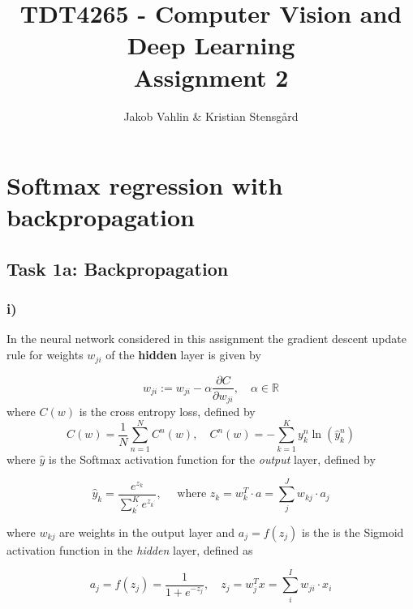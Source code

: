 \documentclass{article}
\date{}
\title{TDT4265 - Computer Vision and Deep Learning \\Assignment 2}
\author{Jakob Vahlin & Kristian Stensgård}
\begin{document}
\maketitle

\tableofcontents
\newpage

\section{Softmax regression with backpropagation}
\subsection{Task 1a: Backpropagation}

\subsubsection*{i)}

In the neural network considered in this assignment the gradient descent update rule for weights $w_{ji}$ of the \textbf{hidden} layer is given by

\begin{equation}
    w_{j i}:=w_{j i}-\alpha \frac{\partial C}{\partial w_{j i}} , \quad \alpha \in \mathbb{R}
    \label{eq:1a_start}
\end{equation}
where $C(w)$ is the cross entropy loss, defined by
\begin{equation}
    C(w)=\frac{1}{N} \sum_{n=1}^{N} C^{n}(w), \quad C^{n}(w)=-\sum_{k=1}^{K} y_{k}^{n} \ln \left(\hat{y}_{k}^{n}\right)
    \label{eq:cross_entropy}
\end{equation}
where $\hat{y}$ is the Softmax activation function for the \textit{output} layer, defined by

\begin{equation}
    \hat{y}_{k}=\frac{e^{z_{k}}}{\sum_{k^{\prime}}^{K} e^{z_{k^{\prime}}}}, \quad \text { where } z_{k}=w_{k}^{T} \cdot a=\sum_{j}^{J} w_{kj} \cdot a_{j}
    \label{eq:softmax}
\end{equation}

where $w_{kj}$ are weights in the output layer and $a_j = f(z_j)$ is the is the Sigmoid activation function  in the \textit{hidden} layer, defined as

\begin{equation}
    a_j =  f(z_j)=\frac{1}{1+e^{-z_j}}, \quad z_j = w_j^{T} x=\sum_{i}^{I} w_{ji} \cdot x_{i}
    \label{eq:sigmoid}
\end{equation}
\end{document}
